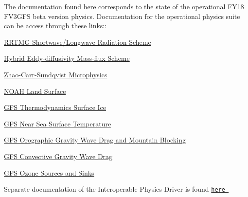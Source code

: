 The documentation found here corresponds to the state of the operational F\+Y18 F\+V3\+G\+FS beta version physics. Documentation for the operational physics suite can be access through these links\+:\+:
\begin{DoxyItemize}
\item \hyperlink{group___r_r_t_m_g}{R\+R\+T\+MG Shortwave/\+Longwave Radiation Scheme}
\item \hyperlink{group___h_e_d_m_f}{Hybrid Eddy-\/diffusivity Mass-\/flux Scheme}
\item \hyperlink{group___zhao-_carr}{Zhao-\/\+Carr-\/\+Sundqvist Microphysics}
\item \hyperlink{group___n_o_a_h}{N\+O\+AH Land Surface}
\item \hyperlink{group___g_f_s___ice}{G\+FS Thermodynamics Surface Ice}
\item \hyperlink{group___g_f_s___n_s_s_t}{G\+FS Near Sea Surface Temperature}
\item \hyperlink{group___g_f_s__ogwd}{G\+FS Orographic Gravity Wave Drag and Mountain Blocking}
\item \hyperlink{group___g_f_s__cgwd}{G\+FS Convective Gravity Wave Drag}
\item \hyperlink{group___g_f_s__ozn}{G\+FS Ozone Sources and Sinks}
\end{DoxyItemize}

Separate documentation of the Interoperable Physics Driver is found \href{http://www.emc.ncep.noaa.gov/NEMS/doxygenDoc/20180327_IPD_Doc/doc/html/index.html}{\tt here } 